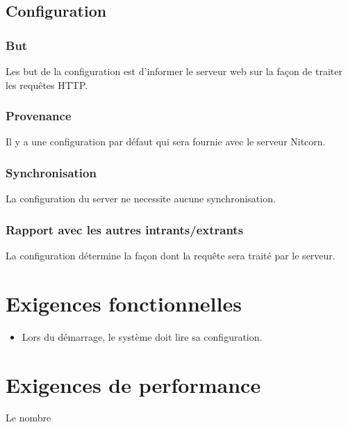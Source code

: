 \documentclass{scrreprt}
\begin{document}
\begin{itemizen}
\subsection{Configuration}
\subsubsection{But} Les but de la configuration est d'informer le serveur web sur la façon de traiter les requêtes HTTP.
\subsubsection{Provenance} Il y a une configuration par défaut qui sera fournie avec le serveur Nitcorn. 
\subsubsection{Synchronisation} La configuration du server ne necessite aucune synchronisation.
\subsubsection{Rapport avec les autres intrants/extrants} La configuration détermine la façon dont la requête sera traité par le serveur.
\section{Exigences fonctionnelles}
\begin{itemize}
    \item Lors du démarrage, le système doit lire sa configuration.
\end{itemize}
\section{Exigences de performance} Le nombre 

\end{itemizen}
\end{document}
